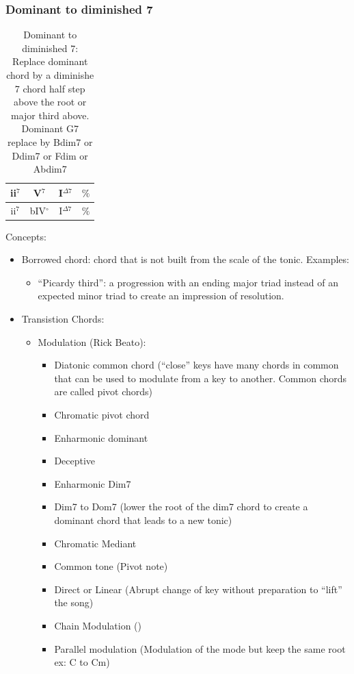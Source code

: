 \documentclass{article}
\begin{document}
\subsubsection{Dominant to diminished 7}
\begin{table}[!h]
	\caption{Dominant to diminished 7: Replace dominant chord by a diminishe 7 chord half step above the root or major third above. Dominant G7 replace by Bdim7 or Ddim7 or Fdim or Abdim7}
	\centering
	\begin{tabular}{| c | c | c | c |}
		\hline
		\phantom{x}ii$^7$\phantom{x} & \phantom{x}V$^7$\phantom{x} & \phantom{x}I$^{\Delta 7}$\phantom{x}  & \phantom{x}$\%$\phantom{x} \\
		\hline
		\phantom{x}ii$^7$\phantom{x} & \phantom{x}bIV$^\circ$\phantom{x} & \phantom{x}I$^{\Delta 7}$\phantom{x}  & \phantom{x}$\%$\phantom{x} \\
		\hline
	\end{tabular}
	\label{tab:diminished }
\end{table}

Concepts:
\begin{itemize}
	\item Borrowed chord: chord that is not built from the scale of the tonic. Examples:
	\begin{itemize}
		\item ``Picardy third'': a progression with an ending major triad instead of an expected minor triad to create an impression of resolution.
	\end{itemize}
	\item Transistion Chords:
	\begin{itemize}
		\item Modulation (Rick Beato):
		\begin{itemize}
			\item Diatonic common chord (``close'' keys have many chords in common that can be used to modulate from a key to another. Common chords are called pivot chords)
			\item Chromatic pivot chord
			\item Enharmonic dominant
			\item Deceptive
			\item Enharmonic Dim7
			\item Dim7 to Dom7 (lower the root of the dim7 chord to create a dominant chord that leads to a new tonic)
			\item Chromatic Mediant
			\item Common tone (Pivot note)
			\item Direct or Linear (Abrupt change of key without preparation to ``lift'' the song)
			\item Chain Modulation ()
			\item Parallel modulation (Modulation of the mode but keep the same root ex: C to Cm)
		\end{itemize}
	\end{itemize}
\end{itemize}
\end{document}
